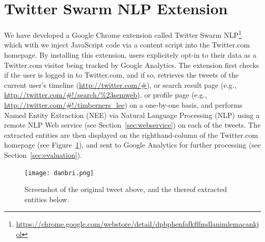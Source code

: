 \documentclass[runningheads,a4paper]{llncs}
\begin{document}
\section{Twitter Swarm NLP Extension}\label{sec:twitterswarm}
We have developed a Google Chrome extension called Twitter Swarm NLP\footnote{\url{https://chrome.google.com/webstore/detail/dpbphenfafkflfmdlanimlemacankjol}} which with we inject JavaScript code via a content script into the Twitter.com homepage. By installing this extension, users explicitely opt-in to their data as a Twitter.com visitor being tracked by Google Analytics. The extension first checks if the user is logged in to Twitter.com, and if so, retrieves the tweets of the current user's timeline (\url{http://twitter.com/#}), or search result page (e.g., \url{http://twitter.com/#!/search/%23semweb}), or profile page (e.g., \url{http://twitter.com/#!/timberners_lee}) on a one-by-one basis, and performs Named Entity Extraction (NEE) via Natural Language Processing (NLP) using a remote NLP Web service (see Section~\ref{sec:webservice}) on each of the tweets. The extracted entities are then displayed on the righthand-column of the Twitter.com homepage (see Figure~\ref{fig:danbri}), and sent to Google Analytics for further processing (see Section~\ref{sec:evaluation}).

\begin{figure}[ht!]
  \centering
  \texttt{[image: danbri.png]}
  \caption{Screenshot of the original tweet above, and the thereof extracted entities below.}
  \label{fig:danbri}
\end{figure}

\end{document}
